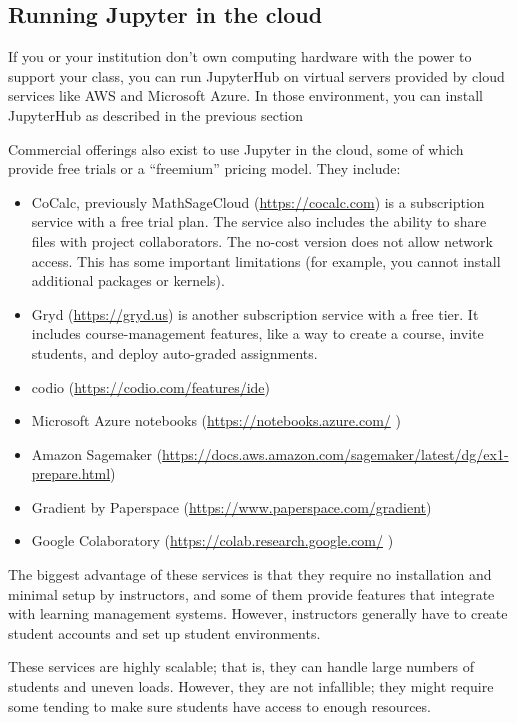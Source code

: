 \documentclass[]{book}
\providecommand{\tightlist}{%
  \setlength{\itemsep}{0pt}\setlength{\parskip}{0pt}}
\begin{document}
\subsection{Running Jupyter in the
cloud}\label{running-jupyter-in-the-cloud}

If you or your institution don't own computing hardware with the power
to support your class, you can run JupyterHub on virtual servers
provided by cloud services like AWS and Microsoft Azure. In those
environment, you can install JupyterHub as described in the previous
section

Commercial offerings also exist to use Jupyter in the cloud, some of
which provide free trials or a ``freemium'' pricing model. They include:

\begin{itemize}
\tightlist
\item
  CoCalc, previously MathSageCloud (\url{https://cocalc.com}) is a
  subscription service with a free trial plan. The service also includes
  the ability to share files with project collaborators. The no-cost
  version does not allow network access. This has some important
  limitations (for example, you cannot install additional packages or
  kernels).
\item
  Gryd (\url{https://gryd.us}) is another subscription service with a
  free tier. It includes course-management features, like a way to
  create a course, invite students, and deploy auto-graded assignments.
\item
  codio (\url{https://codio.com/features/ide})
\item
  Microsoft Azure notebooks (\url{https://notebooks.azure.com/} )
\item
  Amazon Sagemaker
  (\url{https://docs.aws.amazon.com/sagemaker/latest/dg/ex1-prepare.html})
\item
  Gradient by Paperspace (\url{https://www.paperspace.com/gradient})
\item
  Google Colaboratory (\url{https://colab.research.google.com/} )
\end{itemize}

The biggest advantage of these services is that they require no
installation and minimal setup by instructors, and some of them provide
features that integrate with learning management systems. However,
instructors generally have to create student accounts and set up student
environments.

These services are highly scalable; that is, they can handle large
numbers of students and uneven loads. However, they are not infallible;
they might require some tending to make sure students have access to
enough resources.
\end{document}
